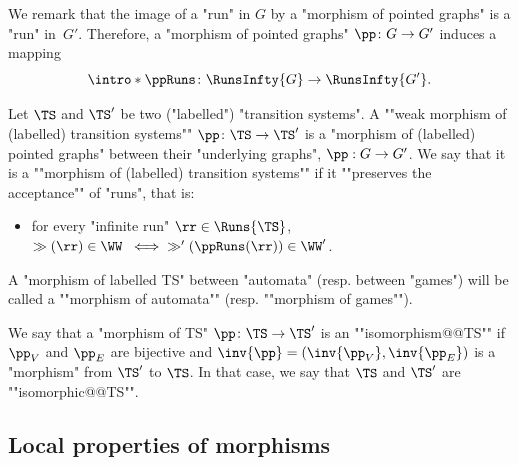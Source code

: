 \documentclass{theoretics}
\begin{document}
\AP We remark that the image of a "run" in $G$ by a "morphism of pointed graphs" is a "run" in~$G'$. Therefore, a "morphism of pointed graphs" $\pp\colon G \to G'$ induces a mapping \[\intro*\ppRuns\colon \RunsInfty{G}\to \RunsInfty{G'}.\] %


\begin{definition}\label{def:morphism_transition_systems}
	\AP Let $\TS$ and $\TS'$ be two ("labelled") "transition systems". A ""weak morphism of (labelled) transition systems"" $\pp\colon \TS \to \TS'$ is a "morphism of (labelled) pointed graphs" between their "underlying graphs", $\pp: G \to G'$.
	\AP We say that it is a ""morphism of (labelled) transition systems"" if it ""preserves the acceptance"" of "runs", that is:
	\begin{itemize}
		\item for every "infinite run" $\rr \in \Runs{\TS}$,  $\gg(\rr) \in \WW \; \iff \; \gg'(\ppRuns(\rr)) \in \WW'$. 
	\end{itemize}
\end{definition}

\AP A "morphism of labelled TS" between "automata" (resp. between "games") will be called a ""morphism of automata"" (resp. ""morphism of games"").

\AP We say that a "morphism of TS" $\pp\colon \TS \to \TS'$ is an ""isomorphism@@TS"" if $\pp_V$ and $\pp_E$ are bijective and $\inv{\pp} = (\inv{\pp_V}, \inv{\pp_E})$ is a "morphism" from $\TS'$ to $\TS$. In that case, we say that $\TS$ and $\TS'$ are ""isomorphic@@TS"".

\subsection{Local properties of morphisms}\label{subsect-morp: loc-bijective-morphisms}
\end{document}
